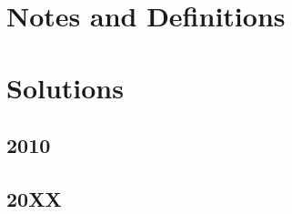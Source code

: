 \documentclass[fleqn,titlepage]{book}
\theoremstyle{plain}
\theoremstyle{definition}
\theoremstyle{remark}
\numberwithin{equation}{section}
\begin{document}
\part{Notes and Definitions}




\part{Solutions}

% 
% 
% 
% 
% 
% 

\chapter{2010}

\chapter{20XX}
\end{document}
